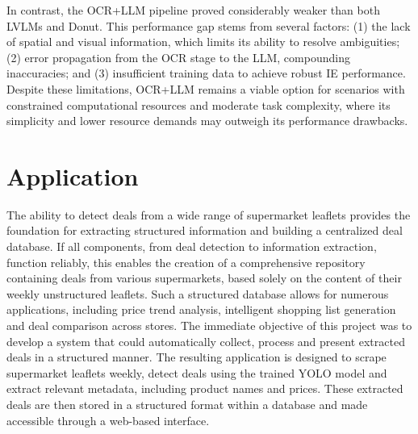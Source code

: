 \documentclass[11pt]{article}
\begin{document}
In contrast, the OCR+LLM pipeline proved considerably weaker than both LVLMs and Donut. This performance gap stems from several factors: (1) the lack of spatial and visual information, which limits its ability to resolve ambiguities; (2) error propagation from the OCR stage to the LLM, compounding inaccuracies; and (3) insufficient training data to achieve robust IE performance. Despite these limitations, OCR+LLM remains a viable option for scenarios with constrained computational resources and moderate task complexity, where its simplicity and lower resource demands may outweigh its performance drawbacks.


\section{Application}
\label{sec:application}
The ability to detect deals from a wide range of supermarket leaflets provides the foundation for extracting structured information and building a centralized deal database. If all components, from deal detection to information extraction, function reliably, this enables the creation of a comprehensive repository containing deals from various supermarkets, based solely on the content of their weekly unstructured leaflets. Such a structured database allows for numerous applications, including price trend analysis, intelligent shopping list generation and deal comparison across stores. The immediate objective of this project was to develop a system that could automatically collect, process and present extracted deals in a structured manner. The resulting application is designed to scrape supermarket leaflets weekly, detect deals using the trained YOLO model and extract relevant metadata, including product names and prices. These extracted deals are then stored in a structured format within a database and made accessible through a web-based interface.
\end{document}
